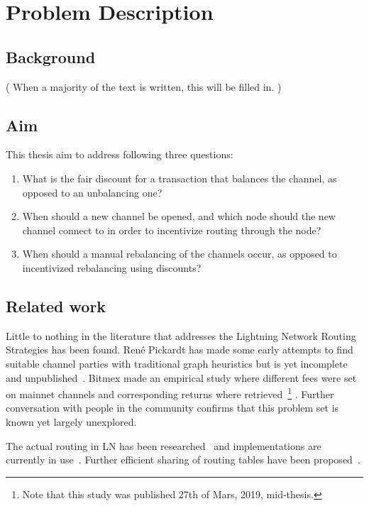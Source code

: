 \chapter{Problem Description}

\section{Background}
    \label{sec:background}

	( When a majority of the text is written, this will be filled in. )

\section{Aim}
    \label{sec:aim}

This thesis aim to address following three questions:

    \begin{enumerate}
	\item What is the fair discount for a transaction that balances the channel, as
		opposed to an unbalancing one?
	\item When should a new channel be opened, and which node should the new
		channel connect to in order to incentivize routing through the node?
	\item When should a manual rebalancing of the channels occur, as opposed to
		incentivized rebalancing using discounts?
    \end{enumerate}

\section{Related work}
    \label{sec:related_work}

	Little to nothing in the literature that addresses the Lightning Network Routing Strategies has been found. René Pickardt has made some early attempts to find suitable channel parties with traditional graph heuristics but is yet incomplete and unpublished~\cite{repository:rene:pickard}. Bitmex made an empirical study where different fees were set on mainnet channels and corresponding returns where retrieved~\cite{bitmex:fee}\footnote{Note that this study was published 27th of Mars, 2019, mid-thesis.} . Further conversation with people in the community confirms that this problem set is known yet largely unexplored.
	
	The actual routing in LN has been researched~\cite{distasi:avallone:cononico:routing} and implementations are currently in use~\cite{repository:clightning, repository:lnd, repository:eclair, repository:lit}. Further efficient sharing of routing tables have been proposed~\cite{gunspan:marco:ant}.
	
